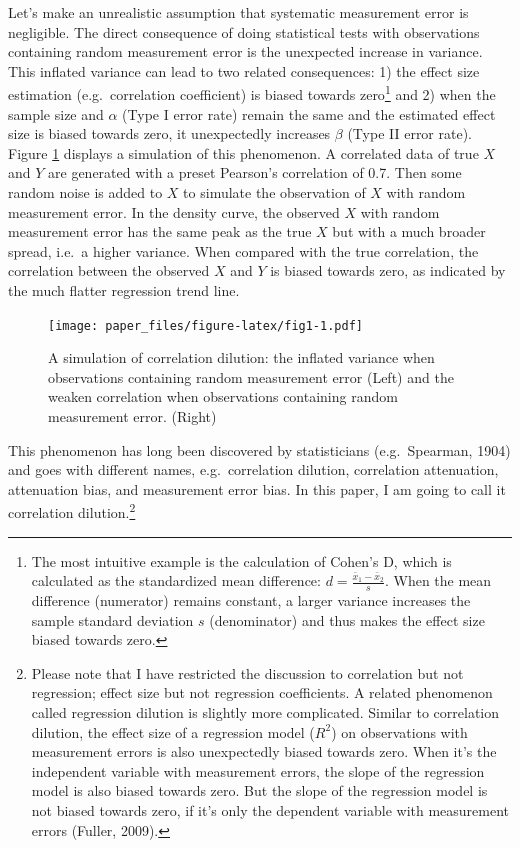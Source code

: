 \documentclass[english,man,floatsintext]{apa6}
\begin{document}
Let's make an unrealistic assumption that systematic measurement error is negligible. The direct consequence of doing statistical tests with observations containing random measurement error is the unexpected increase in variance. This inflated variance can lead to two related consequences: 1) the effect size estimation (e.g.~correlation coefficient) is biased towards zero\footnote{The most intuitive example is the calculation of Cohen's D, which is calculated as the standardized mean difference: \(d = \frac{\bar{x}_1 - \bar{x}_2}{s}\). When the mean difference (numerator) remains constant, a larger variance increases the sample standard deviation \(s\) (denominator) and thus makes the effect size biased towards zero.} and 2) when the sample size and \(\alpha\) (Type I error rate) remain the same and the estimated effect size is biased towards zero, it unexpectedly increases \(\beta\) (Type II error rate). Figure \ref{fig:fig1} displays a simulation of this phenomenon. A correlated data of true \(X\) and \(Y\) are generated with a preset Pearson's correlation of 0.7. Then some random noise is added to \(X\) to simulate the observation of \(X\) with random measurement error. In the density curve, the observed \(X\) with random measurement error has the same peak as the true \(X\) but with a much broader spread, i.e.~a higher variance. When compared with the true correlation, the correlation between the observed \(X\) and \(Y\) is biased towards zero, as indicated by the much flatter regression trend line.

\begin{figure}
\centering
\texttt{[image: paper\_files/figure-latex/fig1-1.pdf]}
\caption{\label{fig:fig1}A simulation of correlation dilution: the inflated variance when observations containing random measurement error (Left) and the weaken correlation when observations containing random measurement error. (Right)}
\end{figure}

This phenomenon has long been discovered by statisticians (e.g.~Spearman, 1904) and goes with different names, e.g.~correlation dilution, correlation attenuation, attenuation bias, and measurement error bias. In this paper, I am going to call it correlation dilution.\footnote{Please note that I have restricted the discussion to correlation but not regression; effect size but not regression coefficients. A related phenomenon called regression dilution is slightly more complicated. Similar to correlation dilution, the effect size of a regression model (\(R^{2}\)) on observations with measurement errors is also unexpectedly biased towards zero. When it's the independent variable with measurement errors, the slope of the regression model is also biased towards zero. But the slope of the regression model is not biased towards zero, if it's only the dependent variable with measurement errors (Fuller, 2009).}
\end{document}
